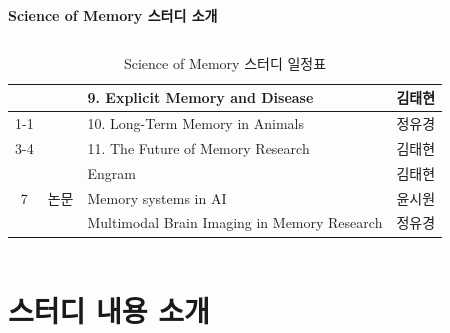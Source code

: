 \documentclass{beamer}
\begin{document}
\begin{frame}{\textbf{Science of Memory 스터디 소개}}
\begin{columns}
\begin{column}{0.6\textwidth}
\begin{table}[]
\begin{tabularx}{\textwidth}{|c|p{1cm}|X|l|}
                         &                                                      & 9. Explicit Memory and Disease                               & 김태현          \\ \cline{1-1} \cline{3-4} 
      \multirow{2}{*}{6} &                                                      & 10. Long-Term Memory in Animals                              & 정유경          \\ \cline{3-4} 
                         &                                                      & 11. The Future of Memory Research                            & 김태현          \\ \hline
      \multirow{3}{*}{7} & \multirow{3}{*}{논문}                                  & Engram                                                       & 김태현          \\ \cline{3-4} 
                         &                                                      & Memory systems in AI                                         & 윤시원          \\ \cline{3-4} 
                         &                                                      & Multimodal Brain Imaging in Memory Research                  & 정유경          \\ \hline
      \end{tabularx}
      \caption{Science of Memory 스터디 일정표}
      \end{table}

    \end{column}
  \end{columns}
\end{frame}

\section{스터디 내용 소개}
\end{document}
